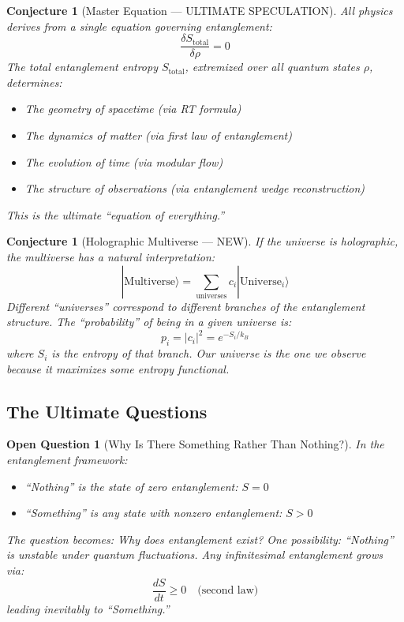 \documentclass[12pt,a4paper]{article}
\newtheorem{conjecture}[theorem]{Conjecture}
\newtheorem*{openquestion}{Open Question}
\begin{document}
\begin{conjecture}[Master Equation --- ULTIMATE SPECULATION]
All physics derives from a single equation governing entanglement:
\begin{equation}
\boxed{\frac{\delta S_{\text{total}}}{\delta \rho} = 0}
\end{equation}
The total entanglement entropy $S_{\text{total}}$, extremized over all quantum states $\rho$, determines:
\begin{itemize}
    \item The geometry of spacetime (via RT formula)
    \item The dynamics of matter (via first law of entanglement)
    \item The evolution of time (via modular flow)
    \item The structure of observations (via entanglement wedge reconstruction)
\end{itemize}
This is the ultimate ``equation of everything.''
\end{conjecture}

\begin{conjecture}[Holographic Multiverse --- NEW]
If the universe is holographic, the multiverse has a natural interpretation:
\begin{equation}
|\text{Multiverse}\rangle = \sum_{\text{universes}} c_i |\text{Universe}_i\rangle
\end{equation}
Different ``universes'' correspond to different branches of the entanglement structure. The ``probability'' of being in a given universe is:
\begin{equation}
p_i = |c_i|^2 = e^{-S_i/k_B}
\end{equation}
where $S_i$ is the entropy of that branch. Our universe is the one we observe because it maximizes some entropy functional.
\end{conjecture}

\subsection{The Ultimate Questions}

\begin{openquestion}[Why Is There Something Rather Than Nothing?]
In the entanglement framework:
\begin{itemize}
    \item ``Nothing'' is the state of zero entanglement: $S = 0$
    \item ``Something'' is any state with nonzero entanglement: $S > 0$
\end{itemize}
The question becomes: Why does entanglement exist? One possibility: ``Nothing'' is unstable under quantum fluctuations. Any infinitesimal entanglement grows via:
\begin{equation}
\frac{dS}{dt} \geq 0 \quad \text{(second law)}
\end{equation}
leading inevitably to ``Something.''
\end{openquestion}
\end{document}
